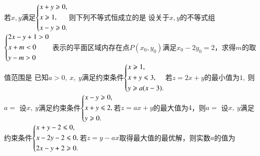 \documentclass{BHCexam}
\begin{document}
\begin{questions}
\qs 若$ x,y $满足$\begin{dcases}
x+y\ge0,\\
x\ge1,\\
x-y\ge0.
\end{dcases}$则下列不等式恒成立的是\xx
{}
\qs 设关于$ x,y $的不等式组$ \begin{dcases}
2x-y+1>0\\x+m<0\\y-m>0
\end{dcases} $
表示的平面区域内存在点$ P(x_0,y_0) $满足$ x_0-2y_0=2 $，求得$ m $的取值范围是\xx
{}
\qs 已知$ a>0,~x,~y $满足约束条件$ \begin{dcases}
x\ge 1,\\
x+y\le 3,\\
y\ge a(x-3).
\end{dcases} $若$ z =2x+y$的最小值为$ 1,~ $则$ a= $\xx
{}
\qs 设$x,~y$满足约束条件$\begin{dcases}
x-y\ge0,\\
x+y\le2,\\
y\ge0.
\end{dcases}$若$ z=ax+y $的最大值为$ 4 $，则$ a= $\xx
{}
\qs 设$ x,~y $满足约束条件$\begin{dcases}
x+y-2\le0,\\
x-2y-2\le0,\\
2x-y+2\ge0.
\end{dcases}$若$ z=y-ax $取得最大值的最优解，则实数$ a $的值为\xx
{}


\end{questions}
\end{document}

